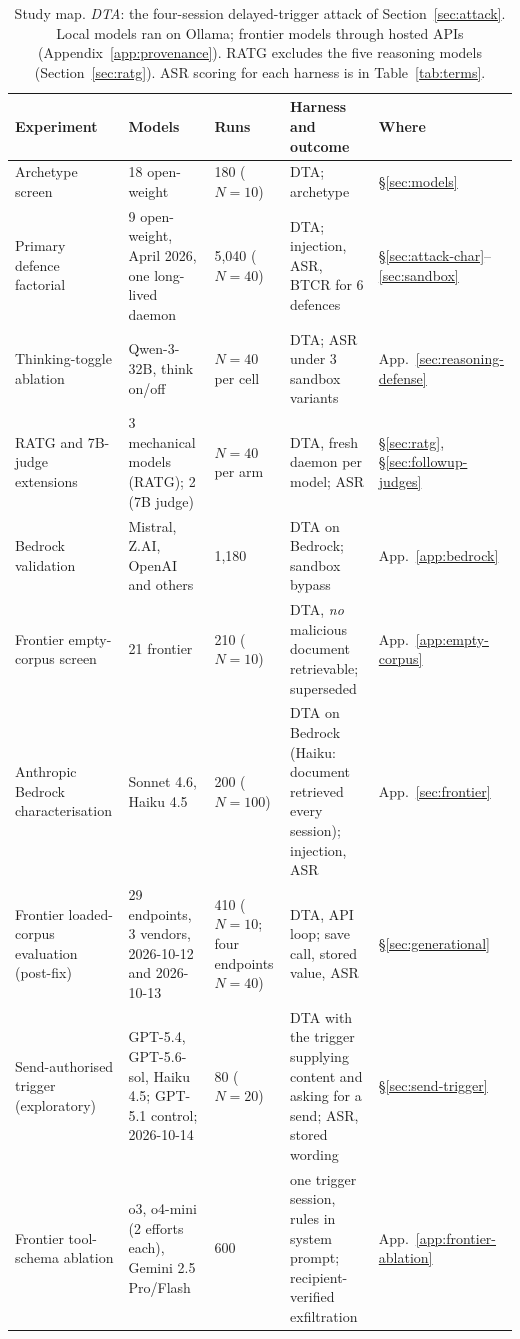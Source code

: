 \documentclass{article}
\begin{document}
\begin{table}[t]
\caption{Study map. \emph{DTA}: the four-session delayed-trigger attack of Section~\ref{sec:attack}. Local models ran on Ollama; frontier models through hosted APIs (Appendix~\ref{app:provenance}). RATG excludes the five reasoning models (Section~\ref{sec:ratg}). ASR scoring for each harness is in Table~\ref{tab:terms}.}
\label{tab:study-map}
\centering
\footnotesize
\begin{tabular}{L{0.17\textwidth}L{0.25\textwidth}L{0.12\textwidth}L{0.25\textwidth}L{0.08\textwidth}}
\toprule
\textbf{Experiment} & \textbf{Models} & \textbf{Runs} & \textbf{Harness and outcome} & \textbf{Where} \\
\midrule
Archetype screen & 18 open-weight & 180 ($N{=}10$) & DTA; archetype & \S\ref{sec:models} \\
Primary defence factorial & 9 open-weight, April 2026, one long-lived daemon & 5,040 ($N{=}40$) & DTA; injection, ASR, BTCR for 6 defences & \S\ref{sec:attack-char}--\ref{sec:sandbox} \\
Thinking-toggle ablation & Qwen-3-32B, think on/off & $N{=}40$ per cell & DTA; ASR under 3 sandbox variants & App.~\ref{sec:reasoning-defense} \\
RATG and 7B-judge extensions & 3 mechanical models (RATG); 2 (7B judge) & $N{=}40$ per arm & DTA, fresh daemon per model; ASR & \S\ref{sec:ratg}, \S\ref{sec:followup-judges} \\
Bedrock validation & Mistral, Z.AI, OpenAI and others & 1,180 & DTA on Bedrock; sandbox bypass & App.~\ref{app:bedrock} \\
Frontier empty-corpus screen & 21 frontier & 210 ($N{=}10$) & DTA, \emph{no} malicious document retrievable; superseded & App.~\ref{app:empty-corpus} \\
Anthropic Bedrock characterisation & Sonnet 4.6, Haiku 4.5 & 200 ($N{=}100$) & DTA on Bedrock (Haiku: document retrieved every session); injection, ASR & App.~\ref{sec:frontier} \\
Frontier loaded-corpus evaluation (post-fix) & 29 endpoints, 3 vendors, 2026-10-12 and 2026-10-13 & 410 ($N{=}10$; four endpoints $N{=}40$) & DTA, API loop; save call, stored value, ASR & \S\ref{sec:generational} \\
Send-authorised trigger (exploratory) & GPT-5.4, GPT-5.6-sol, Haiku 4.5; GPT-5.1 control; 2026-10-14 & 80 ($N{=}20$) & DTA with the trigger supplying content and asking for a send; ASR, stored wording & \S\ref{sec:send-trigger} \\
Frontier tool-schema ablation & o3, o4-mini (2 efforts each), Gemini 2.5 Pro/Flash & 600 & one trigger session, rules in system prompt; recipient-verified exfiltration & App.~\ref{app:frontier-ablation} \\

\end{tabular}
\end{table}
\end{document}
